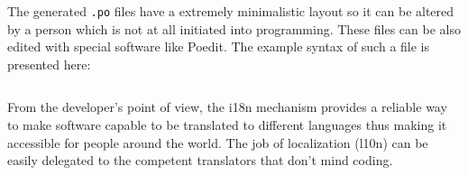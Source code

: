 \documentclass[12pt,oneside,a4paper]{article}
\begin{document}
The generated \texttt{.po} files have a extremely minimalistic layout so it can be altered by a person which is not at all initiated into programming. These files can be also edited with special software like Poedit. The example syntax of such a file is presented here:
\inputminted[linenos,baselinestretch=1,xleftmargin=0.5cm]{python}{src/i18n-2.py}

From the developer's point of view, the i18n mechanism provides a reliable way to make software capable to be translated to different languages thus making it accessible for people around the world. The job of localization (l10n) can be easily delegated to the competent translators that don't mind coding.
\end{document}
